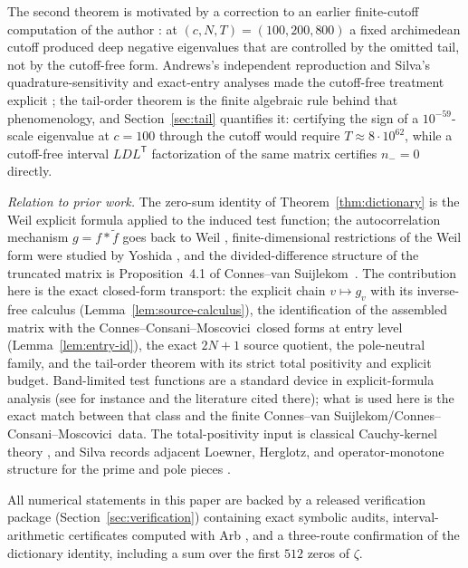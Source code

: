 \documentclass[11pt]{article}
\theoremstyle{plain}
\theoremstyle{definition}
\theoremstyle{remark}
\newcommand{\cvs}{Connes--van Suijlekom}
\newcommand{\ccm}{Connes--Consani--Moscovici}
\begin{document}
The second theorem is motivated by a correction to an earlier finite-cutoff
computation of the author \cite{Groskin2026Zeros}: at $(c,N,T)=(100,200,800)$
a fixed archimedean cutoff produced deep negative eigenvalues that are
controlled by the omitted tail, not by the cutoff-free form.  Andrews's independent reproduction and
Silva's quadrature-sensitivity and exact-entry analyses made the cutoff-free
treatment explicit \cite{Andrews20427500,Silva20650146,Silva20671635}; the
tail-order theorem is the finite algebraic rule behind that phenomenology,
and Section~\ref{sec:tail} quantifies it: certifying the sign of a
$10^{-59}$-scale eigenvalue at $c=100$ through the cutoff would require
$T\approx8\cdot10^{62}$, while a cutoff-free interval $LDL^{\mathsf T}$
factorization of the same matrix certifies $n_-=0$ directly.

\emph{Relation to prior work.}  The zero-sum identity of
Theorem~\ref{thm:dictionary} is the Weil explicit formula applied to the
induced test function; the autocorrelation mechanism $g=f*\tilde f$ goes back
to Weil \cite{Weil1952}, finite-dimensional restrictions of the Weil form were
studied by Yoshida \cite{Yoshida1992}, and the divided-difference structure of
the truncated matrix is Proposition~4.1 of \cvs\
\cite{ConnesvanSuijlekom2025}.  The contribution here is the exact closed-form
transport: the explicit chain $v\mapsto g_v$ with its inverse-free calculus
(Lemma~\ref{lem:source-calculus}), the identification of the assembled matrix
with the \ccm\ closed forms at entry level (Lemma~\ref{lem:entry-id}), the
exact $2N{+}1$ source quotient, the pole-neutral family, and the tail-order
theorem with its strict total positivity and explicit budget.  Band-limited
test functions are a standard device in explicit-formula analysis (see for
instance \cite{ChirreMolero2026} and the literature cited there); what is used
here is the exact match between that class and the finite \cvs/\ccm\ data.
The total-positivity input is classical Cauchy-kernel theory
\cite{Karlin1968,Simon2014CauchyTP,BertolaGekhtmanSzmigielski2009}, and Silva
records adjacent Loewner, Herglotz, and operator-monotone structure for the
prime and pole pieces
\cite{Silva20710075,Silva20737111,Silva20682834,Silva20694588}.

All numerical statements in this paper are backed by a released verification
package (Section~\ref{sec:verification}) containing exact symbolic audits,
interval-arithmetic certificates computed with Arb \cite{Johansson2017Arb},
and a three-route confirmation of the dictionary identity, including a sum
over the first $512$ zeros of $\zeta$.
\end{document}
